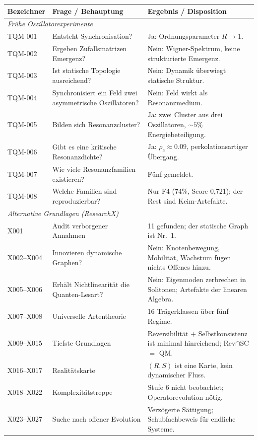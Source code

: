 \documentclass[10pt,twoside,openany]{book}
\begin{document}
\begin{longtable}{p{4.2cm}p{5.2cm}p{5.6cm}}
\toprule
Bezeichner & Frage / Behauptung & Ergebnis / Disposition \\
\midrule
\endhead
\multicolumn{3}{l}{\emph{Frühe Oszillatorexperimente}} \\
\midrule
TQM-001 & Entsteht Synchronisation? & Ja: Ordnungsparameter $R\to1$. \\
TQM-002 & Ergeben Zufallsmatrizen Emergenz? & Nein: Wigner-Spektrum, keine strukturierte Emergenz. \\
TQM-003 & Ist statische Topologie ausreichend? & Nein: Dynamik überwiegt statische Struktur. \\
TQM-004 & Synchronisiert ein Feld zwei asymmetrische Oszillatoren? & Nein: Feld wirkt als Resonanzmedium. \\
TQM-005 & Bilden sich Resonanzcluster? & Ja: zwei Cluster aus drei Oszillatoren, $\sim5\%$ Energiebeteiligung. \\
TQM-006 & Gibt es eine kritische Resonanzdichte? & Ja: $\rho_c\approx0.09$, perkolationsartiger Übergang. \\
TQM-007 & Wie viele Resonanzfamilien existieren? & Fünf gemeldet. \\
TQM-008 & Welche Familien sind reproduzierbar? & Nur F4 (74\%, Score 0,721); der Rest sind Keim-Artefakte. \\
\midrule
\multicolumn{3}{l}{\emph{Alternative Grundlagen (ResearchX)}} \\
\midrule
X001 & Audit verborgener Annahmen & 11 gefunden; der statische Graph ist Nr.~1. \\
X002--X004 & Innovieren dynamische Graphen? & Nein: Knotenbewegung, Mobilität, Wachstum fügen nichts Offenes hinzu. \\
X005--X006 & Erhält Nichtlinearität die Quanten-Lesart? & Nein: Eigenmoden zerbrechen in Solitonen; Artefakte der linearen Algebra. \\
X007--X008 & Universelle Artentheorie & 16 Trägerklassen über fünf Regime. \\
X009--X015 & Tiefste Grundlagen & Reversibilität $+$ Selbstkonsistenz ist minimal hinreichend; Rev$\cap$SC $=$ QM. \\
X016--X017 & Realitätskarte & $(R,S)$ ist eine Karte, kein dynamischer Fluss. \\
X018--X022 & Komplexitätstreppe & Stufe 6 nicht beobachtet; Operatorevolution nötig. \\
X023--X027 & Suche nach offener Evolution & Verzögerte Sättigung; Schubfachbeweis für endliche Systeme. \\

\end{longtable}
\end{document}
